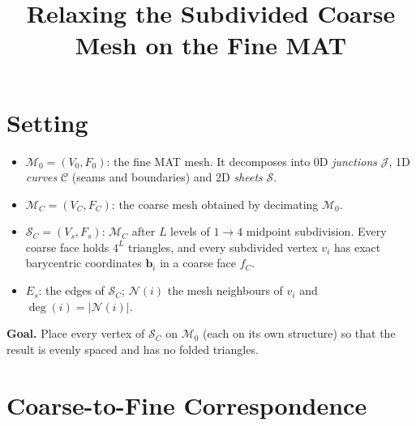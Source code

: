 \documentclass[11pt,a4paper]{article}
\title{\textbf{Relaxing the Subdivided Coarse Mesh on the Fine MAT}}
\date{}
\newcommand{\Fine}{\mathcal{M}_0}
\newcommand{\Coarse}{\mathcal{M}_C}
\newcommand{\Subdiv}{\mathcal{S}_C}
\begin{document}
\maketitle

\section{Setting}

\begin{itemize}
    \item $\Fine = (V_0, F_0)$: the fine MAT mesh. It decomposes into 0D \emph{junctions} $\mathcal{J}$, 1D \emph{curves} $\mathcal{C}$ (seams and boundaries) and 2D \emph{sheets} $\mathcal{S}$.
    \item $\Coarse = (V_C, F_C)$: the coarse mesh obtained by decimating $\Fine$.
    \item $\Subdiv = (V_s, F_s)$: $\Coarse$ after $L$ levels of $1 \to 4$ midpoint subdivision. Every coarse face holds $4^L$ triangles, and every subdivided vertex $v_i$ has exact barycentric coordinates $\mathbf{b}_i$ in a coarse face $f_C$.
    \item $E_s$: the edges of $\Subdiv$; $\mathcal{N}(i)$ the mesh neighbours of $v_i$ and $\deg(i) = |\mathcal{N}(i)|$.
\end{itemize}

\textbf{Goal.} Place every vertex of $\Subdiv$ on $\Fine$ (each on its own structure) so that the result is evenly spaced and has no folded triangles.

\section{Coarse-to-Fine Correspondence}
\end{document}
